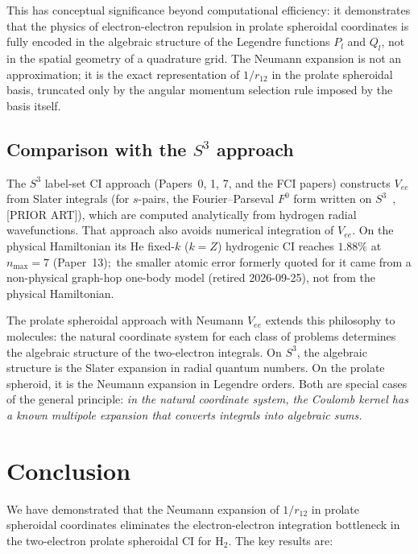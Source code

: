 \documentclass[aps,pra,twocolumn,superscriptaddress,longbibliography]{revtex4-2}
\begin{document}
This has conceptual significance beyond computational
efficiency: it demonstrates that the physics of
electron-electron repulsion in prolate spheroidal
coordinates is fully encoded in the algebraic structure
of the Legendre functions $P_l$ and $Q_l$, not in the
spatial geometry of a quadrature grid.  The Neumann expansion
is not an approximation; it is the exact representation of
$1/r_{12}$ in the prolate spheroidal basis, truncated only
by the angular momentum selection rule imposed by the basis
itself.

\subsection{Comparison with the \texorpdfstring{$S^3$}{S3}
approach}

The $S^3$ label-set CI approach (Papers~0, 1, 7, and the
FCI papers) constructs $V_{ee}$ from Slater integrals (for $s$-pairs, the
Fourier--Parseval $F^0$ form written on $S^3$~\cite{loutey_paper7},
[PRIOR ART]), which are computed analytically from hydrogen radial wavefunctions.
That approach also avoids numerical integration of $V_{ee}$.
On the physical Hamiltonian its He fixed-$k$ ($k=Z$) hydrogenic CI
reaches $1.88\%$ at $n_{\max}=7$ (Paper~13);\ the smaller atomic
error formerly quoted for it came from a non-physical graph-hop
one-body model (retired 2026-09-25), not from the physical
Hamiltonian.

The prolate spheroidal approach with Neumann $V_{ee}$ extends
this philosophy to molecules: the natural coordinate system
for each class of problems determines the algebraic structure
of the two-electron integrals.  On $S^3$, the algebraic
structure is the Slater expansion in radial quantum numbers.
On the prolate spheroid, it is the Neumann expansion in
Legendre orders.  Both are special cases of the general
principle: \emph{in the natural coordinate system, the
Coulomb kernel has a known multipole expansion that converts
integrals into algebraic sums.}


\section{Conclusion}
\label{sec:conclusion}

We have demonstrated that the Neumann expansion of $1/r_{12}$
in prolate spheroidal coordinates eliminates the electron-electron
integration bottleneck in the two-electron prolate spheroidal CI
for H$_2$.  The key results are:
\end{document}
